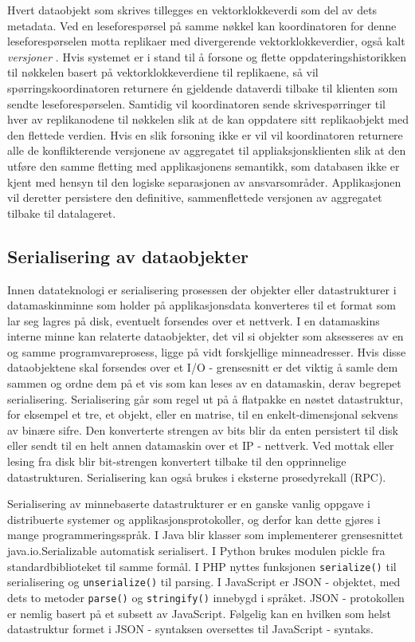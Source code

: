 Hvert dataobjekt som skrives tillegges en vektorklokkeverdi som del av dets metadata. Ved en leseforespørsel på samme nøkkel kan koordinatoren for denne leseforespørselen motta replikaer med divergerende vektorklokkeverdier, også kalt \emph{versjoner} \citep{kreps2009}. Hvis systemet er i stand til å forsone og flette oppdateringshistorikken til nøkkelen basert på vektorklokkeverdiene til replikaene, så vil spørringskoordinatoren returnere én gjeldende dataverdi tilbake til klienten som sendte leseforespørselen. Samtidig vil koordinatoren sende skrivespørringer til hver av replikanodene til nøkkelen slik at de kan oppdatere sitt replikaobjekt med den flettede verdien. Hvis en slik forsoning ikke er vil vil koordinatoren returnere alle de konflikterende versjonene av aggregatet til appliaksjonsklienten slik at den utføre den samme fletting med applikasjonens semantikk, som databasen ikke er kjent med hensyn til den logiske separasjonen av ansvarsområder. Applikasjonen vil deretter persistere den definitive, sammenflettede versjonen av aggregatet tilbake til datalageret.

\subsection{Serialisering av dataobjekter}
Innen datateknologi er serialisering prosessen der objekter eller datastrukturer i datamaskinminne som holder på applikasjonsdata konverteres til et format som lar seg lagres på disk, eventuelt forsendes over et nettverk. I en datamaskins interne minne kan relaterte dataobjekter, det vil si objekter som aksesseres av en og samme programvareprosess, ligge på vidt forskjellige minneadresser. Hvis disse dataobjektene skal forsendes over et I/O - grensesnitt er det viktig å samle dem sammen og ordne dem på et vis som kan leses av en datamaskin, derav begrepet serialisering. Serialisering går som regel ut på å flatpakke en nøstet datastruktur, for eksempel et tre, et objekt, eller en matrise, til en enkelt-dimensjonal sekvens av binære sifre. Den konverterte strengen av bits blir da enten persistert til disk eller sendt til en helt annen datamaskin over et IP - nettverk. Ved mottak eller lesing fra disk blir bit-strengen konvertert tilbake til den opprinnelige datastrukturen. Serialisering kan også brukes i eksterne prosedyrekall (RPC).

Serialisering av minnebaserte datastrukturer er en ganske vanlig oppgave i distribuerte systemer og applikasjonsprotokoller, og derfor kan dette gjøres i mange programmeringsspråk. I Java blir klasser som implementerer grensesnittet java.io.Serializable automatisk serialisert. I Python brukes modulen pickle fra standardbiblioteket til samme formål. I PHP nyttes funksjonen \texttt{serialize()} til serialisering og \texttt{unserialize()} til parsing. I JavaScript er JSON - objektet, med dets to metoder \texttt{parse()} og \texttt{stringify()} innebygd i språket. JSON - protokollen er nemlig basert på et subsett av JavaScript. Følgelig kan en hvilken som helst datastruktur formet i JSON - syntaksen oversettes til JavaScript - syntaks.

